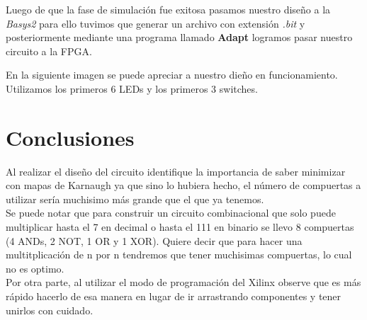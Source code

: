\documentclass{mylib/reporteConCalif}
\begin{document}
Luego de que la fase de simulación fue exitosa pasamos nuestro diseño a la \textit{Basys2} para ello tuvimos que generar un archivo con extensión \textit{.bit} y posteriormente mediante una programa llamado \textbf{Adapt} logramos pasar nuestro circuito a la FPGA.


En la siguiente imagen se puede apreciar a nuestro dieño en funcionamiento. Utilizamos los primeros 6 LEDs y los primeros 3 switches.


\section{Conclusiones}

Al realizar el diseño del circuito identifique la importancia de saber minimizar con mapas de Karnaugh ya que sino lo hubiera hecho, el número de compuertas a utilizar sería muchisimo más grande que el que ya tenemos.\\

Se puede notar que para construir un circuito combinacional que solo puede multiplicar hasta el 7 en decimal o hasta el 111 en binario se llevo 8 compuertas (4 ANDs, 2 NOT, 1 OR y 1 XOR). Quiere decir que para hacer una multitplicación de n por n tendremos que tener muchisimas compuertas, lo cual no es optimo.\\

Por otra parte, al utilizar el modo de programación del Xilinx observe que es más rápido hacerlo de esa manera en lugar de ir arrastrando componentes y tener unirlos con cuidado.
\end{document}
